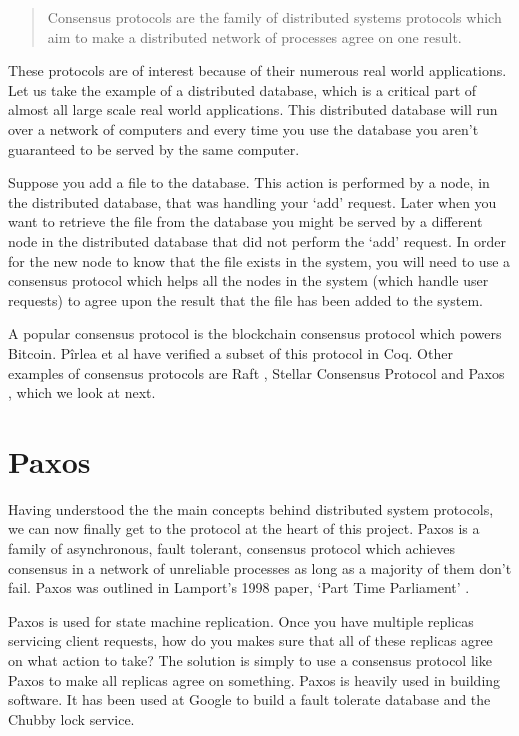 \begin{quote}
Consensus protocols are the family of distributed systems protocols which aim to
make a distributed network of processes agree on one result.
\end{quote}

These protocols are of interest because of their numerous real world applications.
Let us take the example of a distributed database, which is a critical part of almost
all large scale real world applications. This distributed database will run
over a network of computers and every time you use the database you aren't guaranteed
to be served by the same computer.

Suppose you add a file to the database. This action is performed by a node, in
the distributed database, that was handling your `add' request.
Later when you want to retrieve the file from the database
you might be served by a different node in the distributed database
that did not perform the `add' request. In order
for the new node to know that the file exists in the system, you will need to use a
consensus protocol which helps all the nodes in the system (which handle user
requests) to agree upon the result that the file has been added to the system.

A popular consensus protocol is the blockchain consensus protocol which powers Bitcoin.
P\^irlea et al \cite{5} have verified a subset of this protocol in Coq. Other
examples of consensus protocols are Raft \cite{12}, Stellar Consensus Protocol \cite{13}
and Paxos \cite{14}, which we look at next.


\section{Paxos}
Having understood the the main concepts behind distributed system protocols, we can
now finally get to the protocol at the heart of this project. Paxos is a family of
asynchronous, fault tolerant, consensus protocol which achieves consensus in a network
of unreliable processes as long as a majority of them don't fail. Paxos was
outlined in Lamport's 1998 paper, `Part Time Parliament' \cite{4}.

Paxos is used for state machine replication. Once you have multiple replicas
servicing client requests, how do you makes sure that all of these replicas agree
on what action to take? The solution is simply to use a consensus protocol like
Paxos to make all replicas agree on something. Paxos is heavily used in building
software. It has been used at Google to build a fault tolerate database \cite{11}
and the Chubby \cite{12} lock service.

